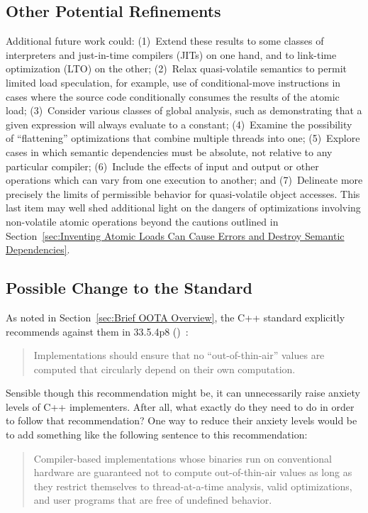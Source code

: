 \subsection{Other Potential Refinements}
\label{sec:Other Potential Refinements}

Additional future work could:
(1)~Extend these results to some classes of interpreters and just-in-time
compilers (JITs) on
one hand, and to link-time optimization (LTO) on the other;
(2)~Relax quasi-volatile semantics to permit limited load speculation,
for example, use of conditional-move instructions in cases where the
source code conditionally consumes the results of the atomic load;
(3)~Consider various classes of global analysis, such as
demonstrating that a given expression will always evaluate to a constant;
(4)~Examine the possibility of ``flattening'' optimizations that combine
multiple threads into one;
(5)~Explore cases in which semantic dependencies must be absolute,
not relative to any particular compiler;
(6)~Include the effects of input and output or other operations which
can vary from one execution to another; and
(7)~Delineate more precisely the limits of permissible behavior for
quasi-volatile object accesses.
This last item may well shed additional light on the dangers of
optimizations involving non-volatile atomic operations beyond the cautions
outlined in
Section~\ref{sec:Inventing Atomic Loads Can Cause Errors and
Destroy Semantic Dependencies}.

\subsection{Possible Change to the Standard}
\label{sec:Possible Change to the Standard}

As noted in Section~\ref{sec:Brief OOTA Overview}, the C++
standard explicitly recommends against them in 33.5.4p8
()~\cite{ThomasKoeppe2023N4950}:
\begin{quote}
	Implementations should ensure that no ``out-of-thin-air'' values
	are computed that circularly depend on their own computation.
\end{quote}

Sensible though this recommendation might be, it can unnecessarily raise
anxiety levels of C++ implementers.
After all, what exactly do they need to do in order to follow that
recommendation?
One way to reduce their anxiety levels would be to add something like
the following sentence to this recommendation:
\begin{quote}
	Compiler-based implementations whose binaries run on conventional
	hardware are guaranteed not to compute out-of-thin-air values as
	long as they restrict themselves to thread-at-a-time analysis,
	valid optimizations, and user programs that are free of undefined
	behavior.
\end{quote}

